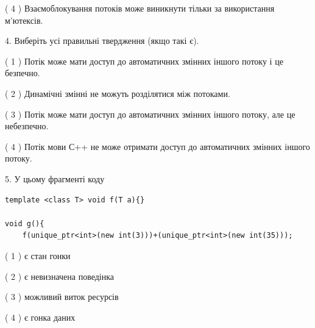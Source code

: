 \documentclass[12pt, ukrainian]{article}
\begin{document}
\begin {large}
{( 4 ) Взаємоблокування потоків може виникнути тільки за використання м’ютексів.%


4. Виберіть усі правильні твердження (якщо такі є).\par
\vspace{2mm}

( 1 ) Потік може мати доступ до автоматичних змінних іншого потоку і це безпечно.%

( 2 ) Динамічні змінні не можуть розділятися між потоками.%

( 3 ) Потік може мати доступ до автоматичних змінних іншого потоку, але це небезпечно.%

( 4 ) Потік мови С++ не може отримати доступ до автоматичних змінних іншого потоку.%


5. У цьому фрагменті коду
\begin{verbatim}
template <class T> void f(T a){}

void g(){
    f(unique_ptr<int>(new int(3)))+(unique_ptr<int>(new int(35)));
\end{verbatim}

( 1 ) є стан гонки%

( 2 ) є невизначена поведінка%

( 3 ) можливий виток ресурсів%

( 4 ) є гонка даних%
}
\end {large}
\end{document}
